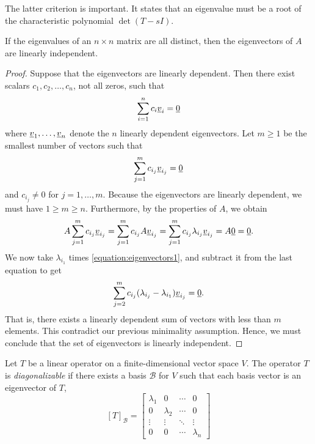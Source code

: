 The latter criterion is important.
It states that an eigenvalue must be a root of the characteristic polynomial $\det( T - sI )$.

\begin{theorem}
If the eigenvalues of an $n \times n$ matrix are all distinct, then the eigenvectors of $A$ are linearly independent.
\end{theorem}
\begin{proof}
Suppose that the eigenvectors are linearly dependent.
Then there exist scalars $c_1, c_2, \ldots, c_n$, not all zeros, such that
\begin{equation*}
\sum_{i=1}^n c_i \underline{v}_i = \underline{0}
\end{equation*}
where $\underline{v}_1, \ldots, \underline{v}_n$ denote the $n$ linearly dependent eigenvectors.
Let $m \geq 1$ be the smallest number of vectors such that
\begin{equation} \label{equation:eigenvectors1}
\sum_{j=1}^m c_{i_j} \underline{v}_{i_j} = \underline{0}
\end{equation}
and $c_{i_j} \neq 0$ for $j = 1, \ldots, m$.
Because the eigenvectors are linearly dependent, we must have $1 \geq m \geq n$.
Furthermore, by the properties of $A$, we obtain
\begin{equation} \label{equation:eigenvectors2}
A \sum_{j=1}^m c_{i_j} \underline{v}_{i_j}
= \sum_{j=1}^m c_{i_j} A \underline{v}_{i_j}
= \sum_{j=1}^m c_{i_j} \lambda_{i_j} \underline{v}_{i_j}
= A \underline{0} = \underline{0} .
\end{equation}
We now take $\lambda_{i_1}$ times \eqref{equation:eigenvectors1}, and subtract it from the last equation to get
\begin{equation*}
\sum_{j=2}^m c_{i_j} (\lambda_{i_j} - \lambda_{i_1})
\underline{v}_{i_j} = \underline{0} .
\end{equation*}
That is, there exists a linearly dependent sum of vectors with less than $m$ elements.
This contradict our previous minimality assumption.
Hence, we must conclude that the set of eigenvectors is linearly independent.
\end{proof}

\begin{definition}
Let $T$ be a linear operator on a finite-dimensional vector space $V$.
The operator $T$ is \emph{diagonalizable} if there exists a basis $\mathcal{B}$ for $V$ such that each basis vector is an eigenvector of $T$,
\begin{equation*}
\left[ T \right]_{\mathcal{B}}
= \left[ \begin{array}{cccc}
\lambda_1 & 0 & \cdots & 0 \\
0 & \lambda_2 & \cdots & 0 \\
\vdots & \vdots & \ddots & \vdots \\
0 & 0 & \cdots & \lambda_n
\end{array} \right]
\end{equation*}
\end{definition}

